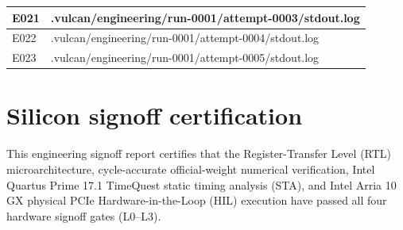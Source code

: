 \documentclass[11pt,a4paper]{article}
\begin{document}
{\begin{longtable}{@{}L{0.12\textwidth}|L{0.82\textwidth}@{}}
E021 & .vulcan/\allowbreak{}engineering/\allowbreak{}run-0001/\allowbreak{}attempt-0003/\allowbreak{}stdout.log\\[2pt]\hline

E022 & .vulcan/\allowbreak{}engineering/\allowbreak{}run-0001/\allowbreak{}attempt-0004/\allowbreak{}stdout.log\\[2pt]\hline

E023 & .vulcan/\allowbreak{}engineering/\allowbreak{}run-0001/\allowbreak{}attempt-0005/\allowbreak{}stdout.log\\[2pt]\hline

\bottomrule\end{longtable}}

\section{Silicon signoff certification}

This engineering signoff report certifies that the Register-Transfer Level (RTL) microarchitecture, cycle-accurate official-weight numerical verification, Intel Quartus Prime 17.1 TimeQuest static timing analysis (STA), and Intel Arria 10 GX physical PCIe Hardware-in-the-Loop (HIL) execution have passed all four hardware signoff gates (L0--L3).
\end{document}
